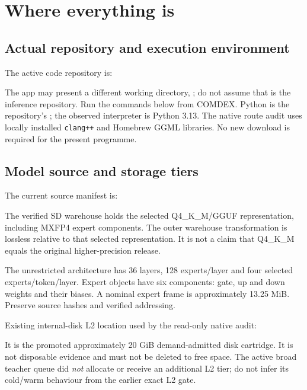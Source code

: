 \documentclass[11pt,a4paper]{article}
\begin{document}
\section{Where everything is}
\subsection{Actual repository and execution environment}
The active code repository is:
\begin{quote}\end{quote}
The app may present a different working directory,
; do not assume that is the
inference repository. Run the commands below from COMDEX. Python is the
repository's ; the observed interpreter is Python 3.13.
The native route audit uses locally installed \texttt{clang++} and Homebrew
GGML libraries. No new download is required for the present programme.

\subsection{Model source and storage tiers}
The current source manifest is:
\begin{quote}\end{quote}
The verified SD warehouse holds the selected Q4\_K\_M/GGUF representation,
including MXFP4 expert components. The outer warehouse transformation is
lossless relative to that selected representation. It is not a claim that
Q4\_K\_M equals the original higher-precision release.

The unrestricted architecture has 36 layers, 128 experts/layer and four
selected experts/token/layer. Expert objects have six components: gate, up
and down weights and their biases. A nominal expert frame is approximately
13.25 MiB. Preserve source hashes and verified addressing.

Existing internal-disk L2 location used by the read-only native audit:
\begin{quote}\end{quote}
It is the promoted approximately 20 GiB demand-admitted disk cartridge.
It is not disposable evidence and must not be deleted to free space.
The active broad teacher queue did \emph{not} allocate or receive an additional
L2 tier; do not infer its cold/warm behaviour from the earlier exact L2 gate.
\end{document}
